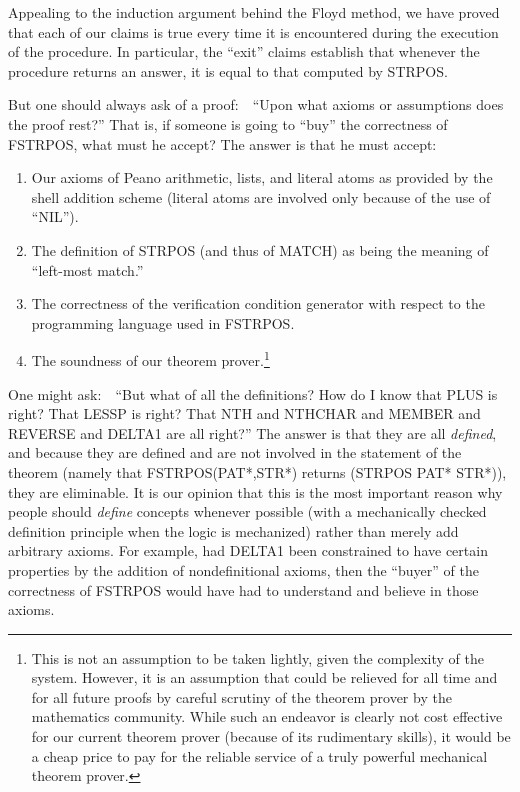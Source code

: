 \documentclass[10pt]{book}
\newenvironment{pubbullet}{\begin{enumerate}}{\end{enumerate}}
\begin{document}
Appealing to the induction argument behind the Floyd method, we have
proved that each of our claims is true every time it is encountered during
the execution of the procedure.  In particular, the ``exit'' claims
establish that whenever the procedure returns an answer, it is equal to
that computed by STRPOS.

But one should always ask of a proof:~~``Upon what axioms or assumptions
does the proof rest?''  That is, if someone is going to ``buy'' the
correctness of FSTRPOS, what must he accept?
The answer is that he must accept:
\begin{pubbullet}
\item Our axioms of Peano arithmetic, lists, and literal atoms
as provided by the shell addition scheme
(literal atoms are involved only because of the use of ``NIL'').
\item The definition of STRPOS (and thus of MATCH) as
being the meaning of ``left-most match.''
\item The correctness of the verification condition generator
with respect to the programming language used in FSTRPOS.
\item The soundness of our theorem prover.\footnote{This is not an assumption to be taken lightly, given the complexity of the system.  However, it is an assumption that could be relieved for all time and for all future proofs by careful scrutiny of the theorem prover by the mathematics community.  While such an endeavor is clearly not cost effective for our current theorem prover (because of its rudimentary skills), it would be a cheap price to pay for the reliable service of a truly powerful mechanical theorem prover.}
\end{pubbullet}
One might ask:~~``But what of all the definitions?  How do I know that
PLUS is right?  That LESSP is right?  That NTH and NTHCHAR and MEMBER
and REVERSE and DELTA1 are all right?''  The answer is that they are all
\emph{defined}, and because they are defined and are not involved
in the statement of the theorem (namely that FSTRPOS(PAT*,STR*) returns
(STRPOS PAT* STR*)), they are eliminable.  It is our opinion that
this is the most important reason why people should
\emph{define} concepts whenever possible (with a mechanically checked
definition principle when the logic is mechanized) rather than merely
add arbitrary axioms.  For example, had DELTA1 been
constrained to have certain properties by the addition of nondefinitional
axioms, then the ``buyer'' of the correctness of FSTRPOS would
have had
to understand and believe in those axioms.
\end{document}
